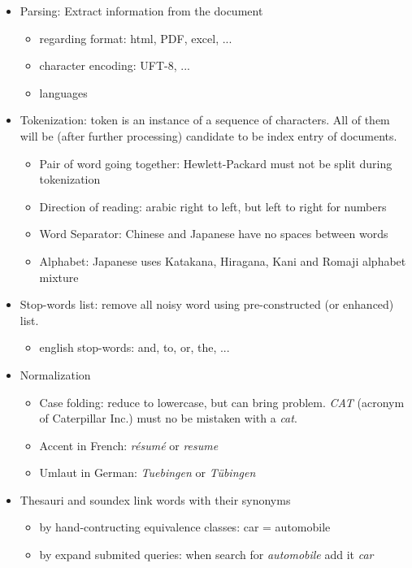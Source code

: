 \begin{itemize}
	\item Parsing: Extract information from the document
	\begin{itemize}
		\item regarding format: html, PDF, excel, ... 
		\item character encoding: UFT-8, ...
		\item languages
	\end{itemize}
	
	\item Tokenization: token is an instance of a sequence of characters. All of them will be (after further processing) candidate to be index entry of documents.
	\begin{itemize}
		\item Pair of word going together: Hewlett-Packard must not be split during tokenization
		\item Direction of reading: arabic right to left, but left to right for numbers
		\item Word Separator: Chinese and Japanese have no spaces between words
		\item Alphabet: Japanese uses Katakana, Hiragana, Kani and Romaji alphabet mixture
	\end{itemize}
	
	\item Stop-words list: remove all noisy word using pre-constructed (or enhanced) list.
	\begin{itemize}
		\item english stop-words: and, to, or, the, ...
	\end{itemize}
	
	\item Normalization
	\begin{itemize}
		\item Case folding: reduce to lowercase, but can bring problem. {\it CAT} (acronym of Caterpillar Inc.) must no be mistaken with a {\it cat}.
		\item Accent in French:  {\it r\'esum\'e} or  {\it resume} 
		\item Umlaut in German: {\it Tuebingen} or {\it T\"ubingen}
	\end{itemize}
	
	\item Thesauri and soundex link words with their synonyms 
	\begin{itemize}
		\item by hand-contructing equivalence classes: car = automobile
		\item by expand submited queries: when search for {\it automobile} add it {\it car}
	\end{itemize}
	

\end{itemize}
